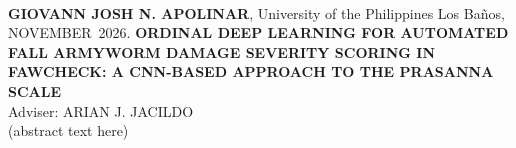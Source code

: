 \documentclass{icsthesis}
\renewcommand{\TITLE}{ORDINAL DEEP LEARNING FOR AUTOMATED FALL ARMYWORM DAMAGE SEVERITY SCORING IN
FAWCHECK: A CNN-BASED APPROACH TO THE PRASANNA SCALE}
\renewcommand{\AUTHOR}{GIOVANN JOSH N. APOLINAR}
\renewcommand{\MONTH}{NOVEMBER}
\renewcommand{\YEAR}{2026}
\newcommand{\ADVISER}{ARIAN J. JACILDO}
\begin{document}
	\begin{frontmatter}
		\maketitle

		\maketableofcontents

		\setcounter{pagecounter}{\value{page}}\addtocounter{pagecounter}{-1}

		\makelistoftables

		\setcounter{pagecounter}{\value{page}}\addtocounter{pagecounter}{-1}
		\makelistoffigures

		\setcounter{pagecounter}{\value{page}}\addtocounter{pagecounter}{-1}
		\begin{abstractwithpageno}
		\\
		\textbf{\AUTHOR}, University of the Philippines Los Ba\~{n}os, \MONTH\ \YEAR.
		\textbf{\TITLE}
		\\Adviser: \ADVISER\\
		(abstract text here)
		\end{abstractwithpageno}

	\end{frontmatter}
\end{document}
